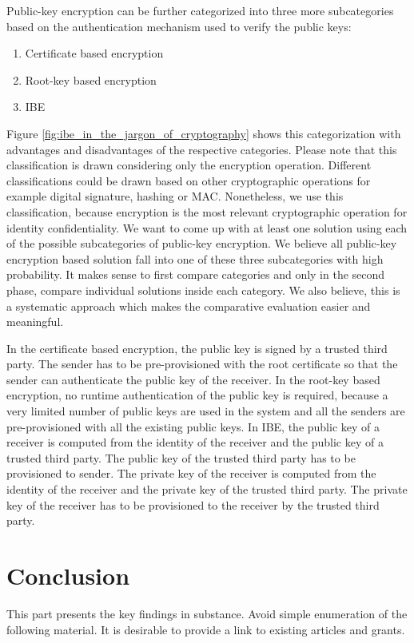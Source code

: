 \documentclass[conference]{IEEEtran}
\begin{document}
Public-key encryption can be further categorized into three more subcategories based on the authentication mechanism used to verify the public keys:
\begin{enumerate}
\item Certificate based encryption
\item Root-key based encryption
\item IBE
\end{enumerate} 
Figure \ref{fig:ibe_in_the_jargon_of_cryptography} shows this categorization with advantages and disadvantages of the respective categories. Please note that this classification is drawn considering only the encryption operation. Different classifications could be drawn based on other cryptographic operations for example digital signature, hashing or MAC. Nonetheless, we use this classification, because encryption is the most relevant cryptographic operation for identity confidentiality. We want to come up with at least one solution using each of the possible subcategories of public-key encryption. We believe all public-key encryption based solution fall into one of these three subcategories with high probability. It makes sense to first compare categories and only in the second phase, compare individual solutions inside each category. We also believe, this is a systematic approach which makes the comparative evaluation easier and meaningful.


In the certificate based encryption, the public key is signed by a trusted third party. The sender has to be pre-provisioned with the root certificate so that the sender can authenticate the public key of the receiver. In the root-key based encryption, no runtime authentication of the public key is required, because a very limited number of public keys are used in the system and all the senders are pre-provisioned with all the existing public keys. In IBE, the public key of a receiver is computed from the identity of the receiver and the public key of a trusted third party. The public key of the trusted third party has to be provisioned to sender. The private key of the receiver is computed from the identity of the receiver and the private key of the trusted third party. The private key of the receiver has to be provisioned to the receiver by the trusted third party.



\section{Conclusion}
This part presents the key findings in substance. Avoid simple enumeration of the following material. It is desirable to provide a link to existing articles and grants. 
\end{document}
